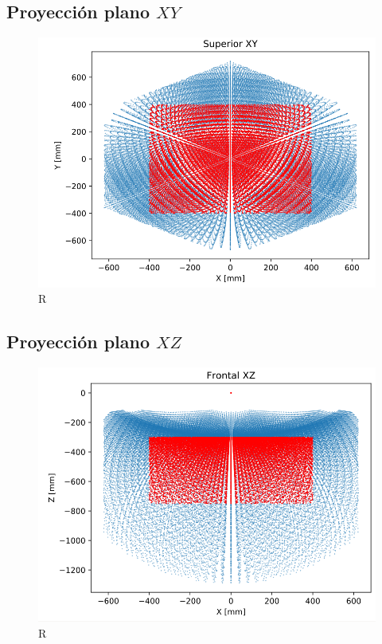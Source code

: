     \newpage

    
    \subsection{Proyección plano $XY$}
        \begin{figure}[h]
            \centering
            \includegraphics[width=0.65\linewidth]{Main/Chapter7/Images7/ws_2.png}
            \caption{R}
            \label{f:cap7_ws2}
        \end{figure}  
    
    \subsection{Proyección plano $XZ$}
        \begin{figure}[h]
            \centering
            \includegraphics[width=0.65\linewidth]{Main/Chapter7/Images7/ws_3.png}
            \caption{R}
            \label{f:cap7_ws3}
        \end{figure}  
        
    \newpage
    
